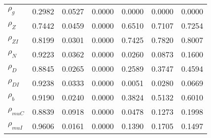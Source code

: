 \begin{center}
\begin{longtable}{lcccccc}
$ {\rho_g}             $	 & 	          0.2982	 & 	          0.0527	 & 	          0.0000	 & 	          0.0000	 & 	          0.0000	 & 	          0.0000 \\ 
$ {\rho_Z}             $	 & 	          0.7442	 & 	          0.0459	 & 	          0.0000	 & 	          0.6510	 & 	          0.7107	 & 	          0.7254 \\ 
$ {\rho_{ZI}}          $	 & 	          0.8199	 & 	          0.0301	 & 	          0.0000	 & 	          0.7425	 & 	          0.7820	 & 	          0.8007 \\ 
$ {\rho_N}             $	 & 	          0.9223	 & 	          0.0362	 & 	          0.0000	 & 	          0.0260	 & 	          0.0873	 & 	          0.1600 \\ 
$ {\rho_D}             $	 & 	          0.8845	 & 	          0.0265	 & 	          0.0000	 & 	          0.2589	 & 	          0.3747	 & 	          0.4594 \\ 
$ {\rho_{DI}}          $	 & 	          0.9238	 & 	          0.0333	 & 	          0.0000	 & 	          0.0051	 & 	          0.0280	 & 	          0.0669 \\ 
$ {\rho_b}             $	 & 	          0.9190	 & 	          0.0240	 & 	          0.0000	 & 	          0.3824	 & 	          0.5132	 & 	          0.6010 \\ 
$ {\rho_{muC}}         $	 & 	          0.8839	 & 	          0.0918	 & 	          0.0000	 & 	          0.0478	 & 	          0.1273	 & 	          0.1998 \\ 
$ {\rho_{muI}}         $	 & 	          0.9606	 & 	          0.0161	 & 	          0.0000	 & 	          0.1390	 & 	          0.1705	 & 	          0.1497 \\ 
\end{longtable}
 \end{center}
